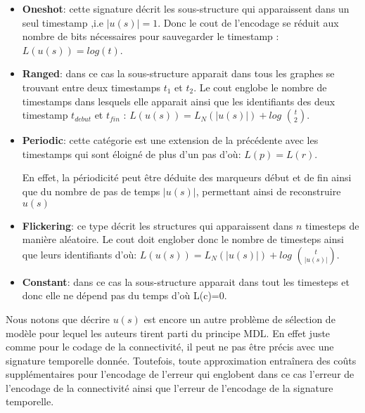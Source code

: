 			 
			 \begin{itemize}[label=$\circ$]
			 \item \textbf{Oneshot}: cette signature décrit les sous-structure qui apparaissent dans un seul timestamp ,i.e $|u(s)|=1$. Donc le cout de l'encodage se réduit aux nombre de bits nécessaires pour sauvegarder le timestamp : $L(u(s)) = log(t)$.
			 \item \textbf{Ranged}: dans ce cas la sous-structure apparait dans tous les graphes se trouvant entre deux timestamps $t_{1}$ et $t_{2}$. Le cout englobe le nombre de timestamps dans lesquels elle apparait ainsi que les identifiants des deux timestamp $t_{debut}$ et $t_{fin}$ : $L(u(s)) = L_{N}(|u(s)|) +log$ ${t}\choose{2}$.
			 \item \textbf{Periodic}: cette catégorie est une extension   de la précédente avec les timestamps qui sont éloigné de plus d'un pas d'où: $L(p) = L(r)$.
			 
			 En effet, la périodicité peut être déduite des marqueurs début et de fin ainsi que du nombre de pas de temps $|u(s)|$, permettant ainsi de reconstruire $u(s)$
			 \item \textbf{Flickering}: ce type décrit les structures qui apparaissent dans $n$ timesteps de manière aléatoire. Le cout doit englober donc le nombre de timesteps ainsi que leurs identifiants d'où: 
			 $L(u(s)) = L_{N}(|u(s)|) +log$ ${t}\choose{|u(s)|}$.
			 \item \textbf{Constant}: dans ce cas la sous-structure apparait dans tout les timesteps et donc elle ne dépend pas du temps d'où L(c)=0.
			 \end{itemize} \label{par:TimeCrunch}
			 
			 
			 Nous notons que décrire $u(s)$ est encore un autre problème de sélection de modèle pour lequel les auteurs tirent parti du principe MDL. En effet juste comme pour le codage de la connectivité, il peut ne pas être précis avec une signature temporelle donnée. Toutefois, toute approximation entraînera des coûts supplémentaires pour l'encodage de l'erreur qui englobent dans ce cas l'erreur de l'encodage de la connectivité ainsi que l'erreur de l'encodage de la signature temporelle.
			 
